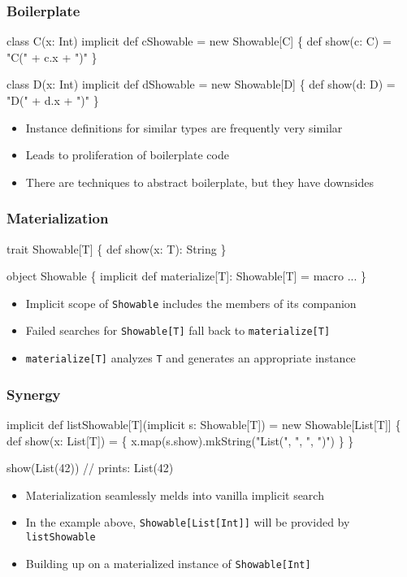 \documentclass[svgnames,hyperref={bookmarks=false}]{beamer}
\begin{document}
\begin{frame}[fragile]
\frametitle{Boilerplate}

\begin{semiverbatim}
class C(x: Int)
implicit def cShowable = new Showable[C] \{
  def show(c: C) = "C(" + c.x + ")"
\}

class D(x: Int)
implicit def dShowable = new Showable[D] \{
  def show(d: D) = "D(" + d.x + ")"
\}

\end{semiverbatim}
\begin{itemize}
\item Instance definitions for similar types are frequently very similar
\item Leads to proliferation of boilerplate code
\item There are techniques to abstract boilerplate, but they have downsides
\end{itemize}
\end{frame}

\begin{frame}[fragile]
\frametitle{Materialization}

\begin{semiverbatim}
trait Showable[T] \{ def show(x: T): String \}

object Showable \{
  implicit def materialize[T]: Showable[T] = macro ...
\}

\end{semiverbatim}
\begin{itemize}
\item Implicit scope of \texttt{Showable} includes the members of its companion
\item Failed searches for \texttt{Showable[T]} fall back to \texttt{materialize[T]}
\item \texttt{materialize[T]} analyzes \texttt{T} and generates an appropriate instance
\end{itemize}
\end{frame}

\begin{frame}[fragile]
\frametitle{Synergy}

\begin{semiverbatim}
implicit def listShowable[T](implicit s: Showable[T]) =
  new Showable[List[T]] \{
    def show(x: List[T]) = \{
      x.map(s.show).mkString("List(", ", ", ")")
    \}
  \}

show(List(42))
// prints: List(42)

\end{semiverbatim}

\begin{itemize}
\item Materialization seamlessly melds into vanilla implicit search
\item In the example above, \texttt{Showable[List[Int]]} will be provided by \texttt{listShowable}
\item Building up on a materialized instance of \texttt{Showable[Int]}
\end{itemize}
\end{frame}
\end{document}
